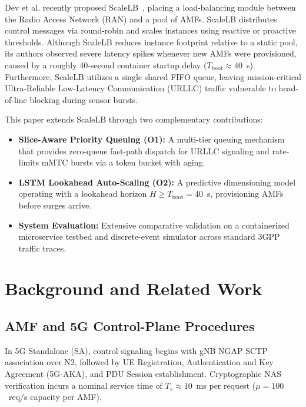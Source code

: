 \documentclass[conference]{IEEEtran}
\begin{document}
Dev et al. recently proposed ScaleLB~\cite{scalelb}, placing a load-balancing module between the Radio Access Network (RAN) and a pool of AMFs. ScaleLB distributes control messages via round-robin and scales instances using reactive or proactive thresholds. Although ScaleLB reduces instance footprint relative to a static pool, its authors observed severe latency spikes whenever new AMFs were provisioned, caused by a roughly 40-second container startup delay ($T_{\text{boot}} \approx 40$~s). Furthermore, ScaleLB utilizes a single shared FIFO queue, leaving mission-critical Ultra-Reliable Low-Latency Communication (URLLC) traffic vulnerable to head-of-line blocking during sensor bursts.

This paper extends ScaleLB through two complementary contributions:
\begin{itemize}
  \item \textbf{Slice-Aware Priority Queuing (O1):} A multi-tier queuing mechanism that provides zero-queue fast-path dispatch for URLLC signaling and rate-limits mMTC bursts via a token bucket with aging.
  \item \textbf{LSTM Lookahead Auto-Scaling (O2):} A predictive dimensioning model operating with a lookahead horizon $H \ge T_{\text{boot}} = 40$~s, provisioning AMFs before surges arrive.
  \item \textbf{System Evaluation:} Extensive comparative validation on a containerized microservice testbed and discrete-event simulator across standard 3GPP traffic traces.
\end{itemize}

\section{Background and Related Work}
\subsection{AMF and 5G Control-Plane Procedures}
In 5G Standalone (SA), control signaling begins with gNB NGAP SCTP association over N2, followed by UE Registration, Authentication and Key Agreement (5G-AKA), and PDU Session establishment. Cryptographic NAS verification incurs a nominal service time of $T_s \approx 10$~ms per request ($\mu = 100$~req/s capacity per AMF).
\end{document}
